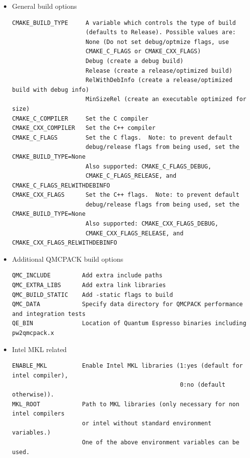 \begin{itemize}
\item General build options
\verbatimfont{\footnotesize}%
\begin{verbatim}
CMAKE_BUILD_TYPE     A variable which controls the type of build
                     (defaults to Release). Possible values are:
                     None (Do not set debug/optmize flags, use
                     CMAKE_C_FLAGS or CMAKE_CXX_FLAGS)
                     Debug (create a debug build)
                     Release (create a release/optimized build)
                     RelWithDebInfo (create a release/optimized build with debug info)
                     MinSizeRel (create an executable optimized for size)
CMAKE_C_COMPILER     Set the C compiler
CMAKE_CXX_COMPILER   Set the C++ compiler
CMAKE_C_FLAGS        Set the C flags.  Note: to prevent default
                     debug/release flags from being used, set the CMAKE_BUILD_TYPE=None
                     Also supported: CMAKE_C_FLAGS_DEBUG,
                     CMAKE_C_FLAGS_RELEASE, and CMAKE_C_FLAGS_RELWITHDEBINFO
CMAKE_CXX_FLAGS      Set the C++ flags.  Note: to prevent default
                     debug/release flags from being used, set the CMAKE_BUILD_TYPE=None
                     Also supported: CMAKE_CXX_FLAGS_DEBUG,
                     CMAKE_CXX_FLAGS_RELEASE, and CMAKE_CXX_FLAGS_RELWITHDEBINFO
\end{verbatim}

\item Additional QMCPACK build options
\verbatimfont{\footnotesize}
\begin{verbatim}
QMC_INCLUDE         Add extra include paths
QMC_EXTRA_LIBS      Add extra link libraries
QMC_BUILD_STATIC    Add -static flags to build
QMC_DATA            Specify data directory for QMCPACK performance and integration tests
QE_BIN              Location of Quantum Espresso binaries including pw2qmcpack.x
\end{verbatim}

\item Intel MKL related
\verbatimfont{\footnotesize}%
\begin{verbatim}
ENABLE_MKL          Enable Intel MKL libraries (1:yes (default for intel compiler),
                                                0:no (default otherwise)).
MKL_ROOT            Path to MKL libraries (only necessary for non intel compilers
                    or intel without standard environment variables.)
                    One of the above environment variables can be used.
\end{verbatim}


\end{itemize}
